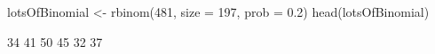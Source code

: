 \begin{Schunk}
\begin{Sinput}
  lotsOfBinomial <- rbinom(481, size = 197, prob = 0.2)
  head(lotsOfBinomial)
\end{Sinput}
\begin{Soutput}
[1] 34 41 50 45 32 37
\end{Soutput}
\end{Schunk}
